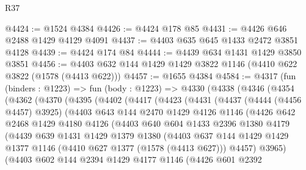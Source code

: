 \begin{lexlean}{R37}
\begin{coremodule}
@4424 := @1524 @4384
@4426 := @4424 @178 @85
@4431 := @4426 @646 @2488 @1429 @4129 @4091
@4437 := @4403 @635 @645 @1433 @2472 @3851 @4128
@4439 := @4424 @174 @84
@4444 := @4439 @634 @1431 @1429 @3850 @3851
@4456 := @4403 @632 @144 @1429 @1429 @3822 @1146 (@4410 @622 @3822 (@1578 (@4413 @622)))
@4457 := @1655 @4384
@4584 := @4317
    (fun (binders : @1223) =>
    fun (body : @1223) =>
    @4330
      (@4338
        (@4346
          (@4354
            (@4362
              (@4370
                (@4395
                  (@4402
                    (@4417
                      (@4423
                        (@4431
                          (@4437
                            (@4444 (@4456 @4457) @3925)
                            (@4403
                              @643
                              @144
                              @2470
                              @1429
                              @4126
                              @1146
                              (@4426
                                @642
                                @2468
                                @1429
                                @4180
                                @4126
                                (@4403
                                  @640
                                  @604
                                  @1433
                                  @2396
                                  @1380
                                  @4179
                                  (@4439
                                    @639
                                    @1431
                                    @1429
                                    @1379
                                    @1380
                                    (@4403
                                      @637
                                      @144
                                      @1429
                                      @1429
                                      @1377
                                      @1146
                                      (@4410 @627 @1377 (@1578 (@4413 @627)))
                                      @4457)
                                    @3965)
                                  (@4403
                                    @602
                                    @144
                                    @2394
                                    @1429
                                    @4177
                                    @1146
                                    (@4426
                                      @601
                                      @2392

\end{coremodule}
\end{lexlean}
